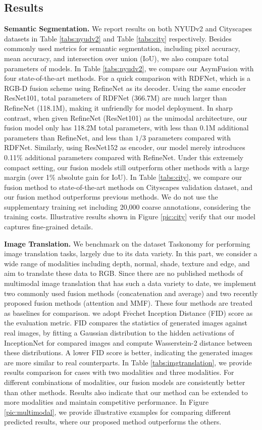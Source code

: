 \documentclass[sigconf]{acmart}
\begin{document}
\subsection{Results}
\textbf{Semantic Segmentation.} We report results on both NYUDv2 and Cityscapes datasets in Table \ref{tabs:nyudv2} and Table \ref{tabs:city} respectively. Besides commonly used metrics for semantic segmentation, including pixel accuracy, mean accuracy, and intersection over union (IoU), we also compare total parameters of models. In Table \ref{tabs:nyudv2}, we compare our AsymFusion with four state-of-the-art methods. For a quick comparison with RDFNet, which is a RGB-D fusion scheme using RefineNet as its decoder. Using the same encoder ResNet101, total parameters of RDFNet (366.7M) are much larger than RefineNet (118.1M), making it unfriendly for model deployment. In sharp contrast, when given RefineNet (ResNet101) as the unimodal architecture, our fusion model only has 118.2M total parameters, with less than 0.1M additional parameters than RefineNet, and less than $1/3$ parameters compared with RDFNet. Similarly, using ResNet152 as encoder, our model merely introduces 0.11\% additional parameters compared with RefineNet. Under this extremely compact setting, our fusion models still outperform other methods with a large margin (over 1\% absolute gain for IoU). In Table \ref{tabs:city}, we compare our fusion method to state-of-the-art methods on Cityscapes validation dataset, and our fusion method outperforms previous methods. We do not use the supplementary training set including 20,000 coarse annotations, considering the training costs. Illustrative results shown in Figure \ref{pic:city} verify that our model captures fine-grained details.



\textbf{Image Translation.} We benchmark on the dataset Taskonomy for performing image translation tasks, largely due to its data variety. In this part, we consider a wide range of modalities including depth, normal, shade, texture and edge, and aim to translate these data to RGB. Since there are no published methods of multimodal image translation that has such a data variety to date, we implement two commonly used fusion methods (concatenation and average) and two recently proposed fusion methods (attention and MMF). These four methods are treated as baselines for comparison. we adopt Fr$\acute{\text{e}}$chet Inception Distance (FID) score as the evaluation metric. FID compares the statistics of generated images against real images, by fitting a Gaussian distribution to the hidden activations of InceptionNet for compared images and compute Wasserstein-2 distance between these distributions. A lower FID score is better, indicating the generated images are more similar to real counterparts. In Table \ref{tabs:imgtranslation}, we provide results comparison for cases with two modalities and three modalities. For different combinations of modalities, our fusion models are  consistently better than other methods. Results also indicate that our method can be extended to more modalities and maintain competitive performance. In Figure \ref{pic:multimodal}, we provide illustrative examples for comparing different predicted results, where our proposed method outperforms the others.
\end{document}
